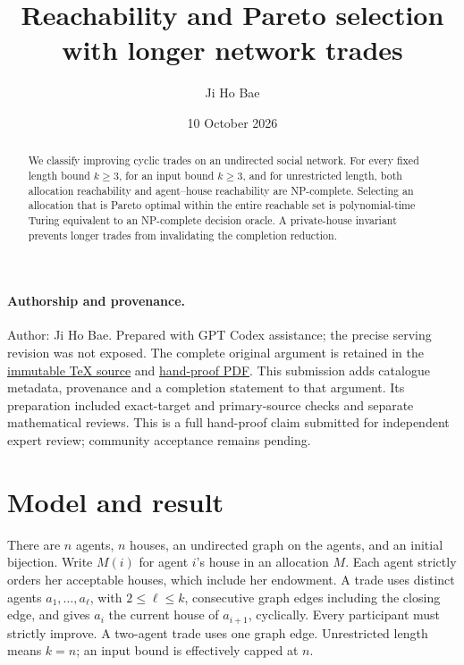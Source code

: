 \documentclass[11pt]{article}
\title{Reachability and Pareto selection with longer network trades}
\author{Ji Ho Bae}
\date{10 October 2026}
\begin{document}
\maketitle

\paragraph{Authorship and provenance.}
Author: Ji Ho Bae. Prepared with GPT Codex assistance; the precise serving
revision was not exposed. The complete original argument is retained in
the \href{https://github.com/jbaelaw/long-cycle-trade-reachability/blob/6ff34b79452d2e25ee6490852608610a949f911b/paper/Proof.tex}{immutable TeX source} and
\href{https://github.com/jbaelaw/long-cycle-trade-reachability/blob/6ff34b79452d2e25ee6490852608610a949f911b/paper/Proof.pdf}{hand-proof PDF}. This submission adds catalogue metadata,
provenance and a completion statement to that argument. Its preparation
included exact-target and primary-source checks and separate mathematical
reviews. This is a full hand-proof claim submitted for independent expert
review; community acceptance remains pending.

\begin{abstract}
We classify improving cyclic trades on an undirected social network.
For every fixed length bound $k\geq3$, for an input bound $k\geq3$,
and for unrestricted length, both allocation reachability and agent--house
reachability are NP-complete. Selecting an allocation that is Pareto
optimal within the entire reachable set is polynomial-time Turing
equivalent to an NP-complete decision oracle. A private-house invariant
prevents longer trades from invalidating the completion reduction.
\end{abstract}

\section{Model and result}
There are $n$ agents, $n$ houses, an undirected graph on the agents, and
an initial bijection. Write $M(i)$ for agent $i$'s house in an allocation $M$.
Each agent strictly orders her acceptable houses,
which include her endowment. A trade uses distinct agents
$a_1,\ldots,a_\ell$, with $2\leq\ell\leq k$, consecutive graph edges
including the closing edge, and gives $a_i$ the current house of
$a_{i+1}$, cyclically. Every participant must strictly improve.
A two-agent trade uses one graph edge. Unrestricted length means $k=n$;
an input bound is effectively capped at $n$.
\end{document}
